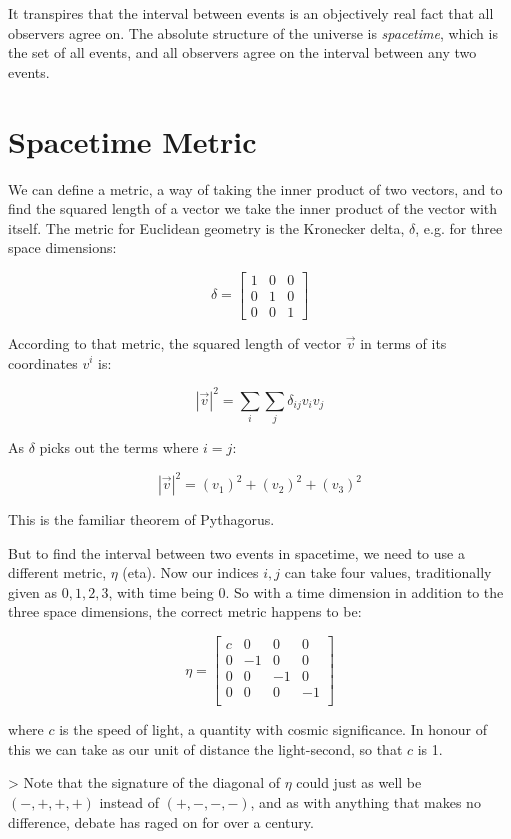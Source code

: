 It transpires that the interval between events is an objectively real fact that all observers agree on. The absolute structure of the universe is \textit{spacetime}, which is the set of all events, and all observers agree on the interval between any two events.

\section{Spacetime Metric}

We can define a metric, a way of taking the inner product of two vectors, and to find the squared length of a vector we take the inner product of the vector with itself. The metric for Euclidean geometry is the Kronecker delta, $\delta$, e.g. for three space dimensions:

$$
\delta =
\begin{bmatrix}
1 & 0 & 0 \\
0 & 1 & 0 \\
0 & 0 & 1
\end{bmatrix}
$$

According to that metric, the squared length of vector $\vec{v}$ in terms of its coordinates $v^i$ is:

$$|\vec{v}|^2 = \sum_i \sum_j \delta_{ij}v_iv_j$$

As $\delta$ picks out the terms where $i = j$:

$$|\vec{v}|^2 = (v_1)^2 + (v_2)^2 + (v_3)^2$$

This is the familiar theorem of Pythagorus.

But to find the interval between two events in spacetime, we need to use a different metric, $\eta$ (eta). Now our indices $i, j$ can take four values, traditionally given as $0, 1, 2, 3$, with time being $0$. So with a time dimension in addition to the three space dimensions, the correct metric happens to be:

$$
\eta =
\begin{bmatrix}
c & 0 & 0 & 0 \\
0 & -1 & 0 & 0 \\
0 & 0 & -1 & 0 \\
0 & 0 & 0 & -1 \\
\end{bmatrix}
$$

where $c$ is the speed of light, a quantity with cosmic significance. In honour of this we can take as our unit of distance the light-second, so that $c$ is 1.

> Note that the signature of the diagonal of $\eta$ could just as well be $(-, +, +, +)$ instead of $(+, -, -, -)$, and as with anything that makes no difference, debate has raged on for over a century.

